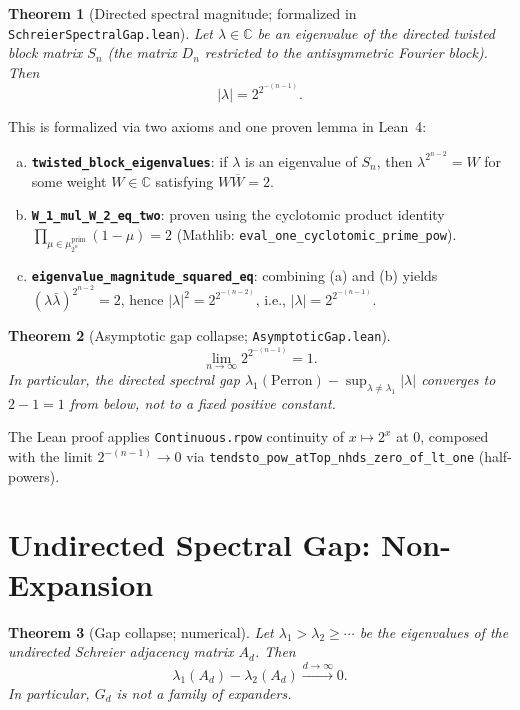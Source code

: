 \documentclass[12pt]{article}
\newtheorem{theorem}{Theorem}[section]
\newcommand{\C}{\mathbb{C}}
\newcommand{\abs}[1]{\left\lvert #1 \right\rvert}
\begin{document}
\begin{theorem}[Directed spectral magnitude; formalized in
  \texttt{SchreierSpectralGap.lean}]
  \label{thm:directed-mag}
  Let $\lambda \in \C$ be an eigenvalue of the directed twisted block
  matrix $S_n$ (the matrix $D_n$ restricted to the antisymmetric Fourier
  block).  Then
  \[
    \abs{\lambda} = 2^{2^{-(n-1)}}.
  \]
\end{theorem}

This is formalized via two axioms and one proven lemma in Lean~4:
\begin{enumerate}[(a)]
  \item \textbf{\texttt{twisted\_block\_eigenvalues}}: if $\lambda$ is
    an eigenvalue of $S_n$, then $\lambda^{2^{n-2}} = W$ for some
    weight $W \in \C$ satisfying $W\overline{W} = 2$.
  \item \textbf{\texttt{W\_1\_mul\_W\_2\_eq\_two}}: proven using the
    cyclotomic product identity
    $\prod_{\mu \in \mu_{2^n}^{\text{prim}}} (1 - \mu) = 2$
    (Mathlib: \texttt{eval\_one\_cyclotomic\_prime\_pow}).
  \item \textbf{\texttt{eigenvalue\_magnitude\_squared\_eq}}: combining
    (a) and (b) yields $(\lambda\bar\lambda)^{2^{n-2}} = 2$, hence
    $\abs{\lambda}^2 = 2^{2^{-(n-2)}}$, i.e., $\abs{\lambda} = 2^{2^{-(n-1)}}$.
\end{enumerate}

\begin{theorem}[Asymptotic gap collapse; \texttt{AsymptoticGap.lean}]
  \label{thm:asymp}
  \[
    \lim_{n \to \infty} 2^{2^{-(n-1)}} = 1.
  \]
  In particular, the directed spectral gap
  $\lambda_1(\text{Perron}) - \sup_{\lambda \ne \lambda_1}\abs{\lambda}$
  converges to $2 - 1 = 1$ from below, not to a fixed positive constant.
\end{theorem}

The Lean proof applies \texttt{Continuous.rpow} continuity of
$x \mapsto 2^x$ at $0$, composed with the limit
$2^{-(n-1)} \to 0$ via \texttt{tendsto\_pow\_atTop\_nhds\_zero\_of\_lt\_one}
(half-powers).

\section{Undirected Spectral Gap: Non-Expansion}
\label{sec:undirected}

\begin{theorem}[Gap collapse; numerical]
  \label{thm:gap}
  Let $\lambda_1 > \lambda_2 \ge \cdots$ be the eigenvalues of
  the undirected Schreier adjacency matrix $A_d$.  Then
  \[
    \lambda_1(A_d) - \lambda_2(A_d) \xrightarrow{d \to \infty} 0.
  \]
  In particular, $G_d$ is not a family of expanders.
\end{theorem}
\end{document}
